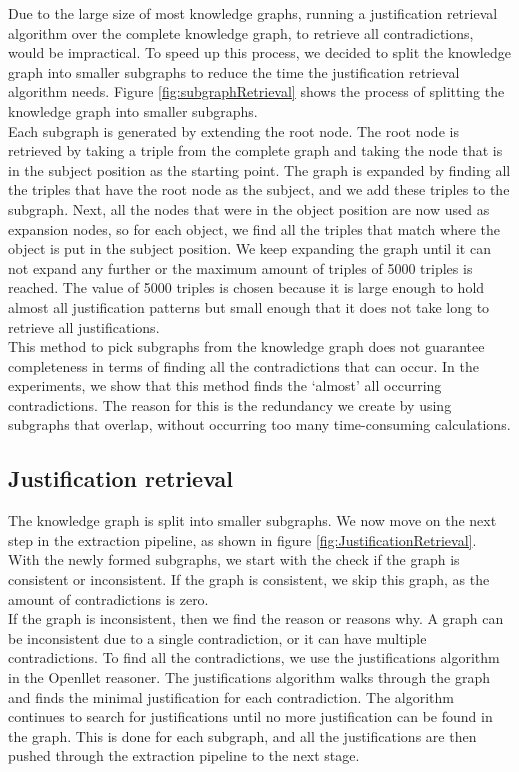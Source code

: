 \documentclass[11pt,letterpaper ,oneside ]{book}
\begin{document}
	Due to the large size of most knowledge graphs, running a justification retrieval algorithm over the complete knowledge graph, to retrieve all contradictions, would be impractical. To speed up this process, we decided to split the knowledge graph into smaller subgraphs to reduce the time the justification retrieval algorithm needs. Figure \ref{fig:subgraphRetrieval} shows the process of splitting the knowledge graph into smaller subgraphs.\\
	Each subgraph is generated by extending the root node. The root node is retrieved by taking a triple from the complete graph and taking the node that is in the subject position as the starting point. The graph is expanded by finding all the triples that have the root node as the subject, and we add these triples to the subgraph. Next, all the nodes that were in the object position are now used as expansion nodes, so for each object, we find all the triples that match where the object is put in the subject position. We keep expanding the graph until it can not expand any further or the maximum amount of triples of 5000 triples is reached. The value of 5000 triples is chosen because it is large enough to hold almost all justification patterns but small enough that it does not take long to retrieve all justifications.\\
	
	This method to pick subgraphs from the knowledge graph does not guarantee completeness in terms of finding all the contradictions that can occur. In the experiments, we show that this method finds the `almost' all occurring contradictions. The reason for this is the redundancy we create by using subgraphs that overlap, without occurring too many time-consuming calculations. 
	
	\subsection{Justification retrieval}
	The knowledge graph is split into smaller subgraphs. We now move on the next step in the extraction pipeline, as shown in figure \ref{fig:JustificationRetrieval}.
	With the newly formed subgraphs, we start with the check if the graph is consistent or inconsistent. If the graph is consistent, we skip this graph, as the amount of contradictions is zero.\\ 
	If the graph is inconsistent, then we find the reason or reasons why. A graph can be inconsistent due to a single contradiction, or it can have multiple contradictions. 
	To find all the contradictions, we use the justifications algorithm in the Openllet reasoner. The justifications algorithm walks through the graph and finds the minimal justification for each contradiction. The algorithm continues to search for justifications until no more justification can be found in the graph. This is done for each subgraph, and all the justifications are then pushed through the extraction pipeline to the next stage.\\
	
\end{document}
